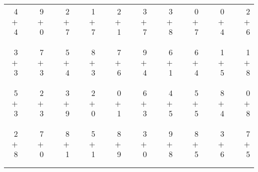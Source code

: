 \documentclass[12pt, letterpaper]{article}
\begin{document}
\begin{tabular}{rrrrrrrrrrrrrrrrrrr}
4 & & 9 & & 2 & & 1 & & 2 & & 3 & & 3 & & 0 & & 0 & & 2\\
$+$ 4 & & $+$ 0 & & $+$ 7 & & $+$ 7 & & $+$ 1 & & $+$ 7 & & $+$ 8 & & $+$ 7 & & $+$ 4 & & $+$ 6\\
\cline{1-1} \cline{3-3} \cline{5-5} \cline{7-7} \cline{9-9} \cline{11-11} \cline{13-13} \cline{15-15} \cline{17-17} \cline{19-19} \\ \\
3 & & 7 & & 5 & & 8 & & 7 & & 9 & & 6 & & 6 & & 1 & & 1\\
$+$ 3 & & $+$ 3 & & $+$ 4 & & $+$ 3 & & $+$ 6 & & $+$ 4 & & $+$ 1 & & $+$ 4 & & $+$ 5 & & $+$ 8\\
\cline{1-1} \cline{3-3} \cline{5-5} \cline{7-7} \cline{9-9} \cline{11-11} \cline{13-13} \cline{15-15} \cline{17-17} \cline{19-19} \\ \\
5 & & 2 & & 3 & & 2 & & 0 & & 6 & & 4 & & 5 & & 8 & & 0\\
$+$ 3 & & $+$ 3 & & $+$ 9 & & $+$ 0 & & $+$ 1 & & $+$ 3 & & $+$ 5 & & $+$ 5 & & $+$ 4 & & $+$ 8\\
\cline{1-1} \cline{3-3} \cline{5-5} \cline{7-7} \cline{9-9} \cline{11-11} \cline{13-13} \cline{15-15} \cline{17-17} \cline{19-19} \\ \\
2 & & 7 & & 8 & & 5 & & 8 & & 3 & & 9 & & 8 & & 3 & & 7\\
$+$ 8 & & $+$ 0 & & $+$ 1 & & $+$ 1 & & $+$ 9 & & $+$ 0 & & $+$ 8 & & $+$ 5 & & $+$ 6 & & $+$ 5\\
\cline{1-1} \cline{3-3} \cline{5-5} \cline{7-7} \cline{9-9} \cline{11-11} \cline{13-13} \cline{15-15} \cline{17-17} \cline{19-19} \\ \\
\end{tabular}
\newpage
\end{document}
